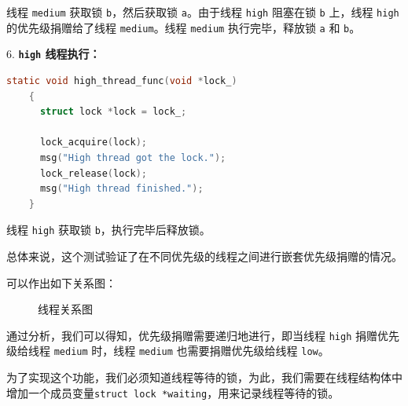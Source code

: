 \documentclass{article}
\begin{document}
线程 \texttt{medium} 获取锁 \texttt{b}，然后获取锁 \texttt{a}。由于线程 \texttt{high} 阻塞在锁 \texttt{b} 上，线程 \texttt{high} 的优先级捐赠给了线程 \texttt{medium}。线程 \texttt{medium} 执行完毕，释放锁 \texttt{a} 和 \texttt{b}。

6. \textbf{\texttt{high} 线程执行：}
\begin{lstlisting}[language=C]
    static void high_thread_func(void *lock_) 
    {
      struct lock *lock = lock_;

      lock_acquire(lock);
      msg("High thread got the lock.");
      lock_release(lock);
      msg("High thread finished.");
    }
\end{lstlisting}

线程 \texttt{high} 获取锁 \texttt{b}，执行完毕后释放锁。

总体来说，这个测试验证了在不同优先级的线程之间进行嵌套优先级捐赠的情况。

可以作出如下关系图：

\begin{figure}[H]
  \centering
  \caption{线程关系图}
\end{figure}

通过分析，我们可以得知，优先级捐赠需要递归地进行，即当线程 \texttt{high} 捐赠优先级给线程 \texttt{medium} 时，线程 \texttt{medium} 也需要捐赠优先级给线程 \texttt{low}。

为了实现这个功能，我们必须知道线程等待的锁，为此，我们需要在线程结构体中增加一个成员变量\texttt{struct lock *waiting}，用来记录线程等待的锁。
\end{document}
